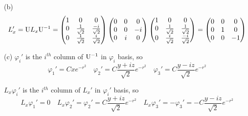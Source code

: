 \documentclass[a4paper]{article}
\begin{document}
(b)
\[
L_x'=\mathrm{U}L_x\mathrm{U}^{-1}=
\begin{pmatrix}
1&0&0\\
0&\frac{1}{\sqrt{2}}&\frac{-i}{\sqrt{2}}\\
0&\frac{1}{\sqrt{2}}&\frac{i}{\sqrt{2}}\\
\end{pmatrix}
\begin{pmatrix}
0&0&0\\
0&0&-i\\
0&i&0
\end{pmatrix}
\begin{pmatrix}
1&0&0\\
0&\frac{1}{\sqrt{2}}&\frac{1}{\sqrt{2}}\\
0&\frac{i}{\sqrt{2}}&\frac{-i}{\sqrt{2}}\\
\end{pmatrix}=
\begin{pmatrix}
0&0&0\\
0&1&0\\
0&0&-1
\end{pmatrix}
\]

(c) $\varphi_i'$ is the $i^{th}$ column of $\mathrm{U}^{-1}$ in $\varphi_i$ basis, so
\[
\varphi_1'=Cxe^{-r^2}\quad\varphi_2'=C\frac{y+iz}{\sqrt{2}}e^{-r^2}\quad\varphi_3'=C\frac{y-iz}{\sqrt{2}}e^{-r^2}
\]

$L_x\varphi_i'$ is the $i^{th}$ column of $L_x'$ in $\varphi_i'$ basis, so
\[
L_x\varphi_1'=0\quad L_x\varphi_2'=\varphi_2'=C\frac{y+iz}{\sqrt{2}}e^{-r^2}\quad L_x\varphi_3'=-\varphi_3'=-C\frac{y-iz}{\sqrt{2}}e^{-r^2} 
\]
\end{document}
